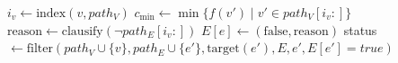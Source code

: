 \begin{algorithm}[H]
    \caption{Cycle Filter}
    \begin{algorithmic}[1]
            \State $i_v \gets \text{index}(v, path_V)$
            \State $c_{\text{min}} \gets \min\{f(v') \mid v' \in path_V[i_v:]\}$
                \State $\text{reason} \gets \text{clausify}(\neg path_E[i_v:])$
                \State $E[e] \gets (\text{false}, \text{reason})$
            \EndIf
        \Else 
                    \State status $\gets \text{filter}(path_V \cup \{v\}, path_E \cup \{e'\}, \text{target}(e'), E, e', E[e'] = \textit{true})$
                \EndFor
            \EndIf
        \EndIf
    \EndFunction
    \end{algorithmic}
    \label{alg:cycle-filter-v1}
\end{algorithm}